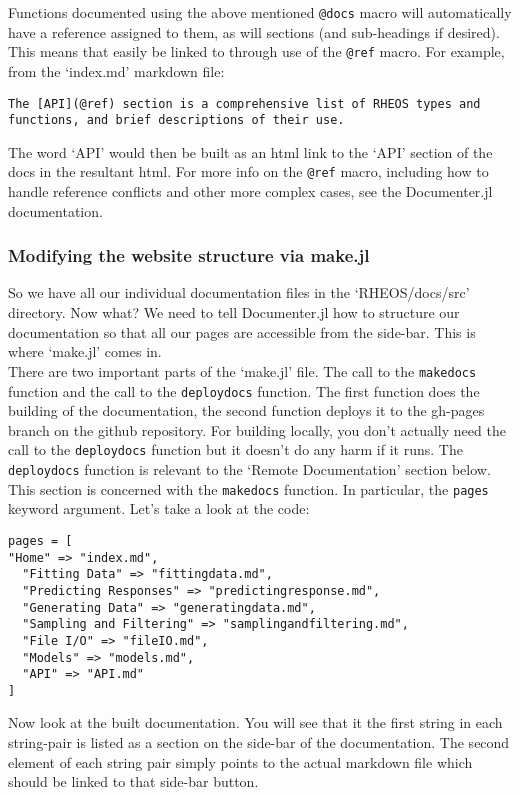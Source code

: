 \documentclass[]{article}
\newcommand{\cod}[1]{\colorbox{light-gray}{\texttt{#1}}}
\begin{document}
Functions documented using the above mentioned \cod{@docs} macro will automatically have a reference assigned to them, as will sections (and sub-headings if desired). This means that easily be linked to through use of the \cod{@ref} macro. For example, from the `index.md' markdown file:
\begin{verbatim}
The [API](@ref) section is a comprehensive list of RHEOS types and 
functions, and brief descriptions of their use.
\end{verbatim}
The word `API' would then be built as an html link to the `API' section of the docs in the resultant html. For more info on the \cod{@ref} macro, including how to handle reference conflicts and other more complex cases, see the Documenter.jl documentation.

\subsubsection{Modifying the website structure via make.jl}
So we have all our individual documentation files in the `RHEOS/docs/src' directory. Now what? We need to tell Documenter.jl how to structure our documentation so that all our pages are accessible from the side-bar. This is where `make.jl' comes in.\\

There are two important parts of the `make.jl' file. The call to the \cod{makedocs} function and the call to the \cod{deploydocs} function. The first function does the building of the documentation, the second function deploys it to the gh-pages branch on the github repository. For building locally, you don't actually need the call to the \cod{deploydocs} function but it doesn't do any harm if it runs. The \cod{deploydocs} function is relevant to the `Remote Documentation' section below. This section is concerned with the \cod{makedocs} function. In particular, the \cod{pages} keyword argument. Let's take a look at the code:
\begin{verbatim}
pages = [
"Home" => "index.md",
  "Fitting Data" => "fittingdata.md",
  "Predicting Responses" => "predictingresponse.md",
  "Generating Data" => "generatingdata.md",
  "Sampling and Filtering" => "samplingandfiltering.md",
  "File I/O" => "fileIO.md",
  "Models" => "models.md",
  "API" => "API.md"
]
\end{verbatim}
Now look at the built documentation. You will see that it the first string in each string-pair is listed as a section on the side-bar of the documentation. The second element of each string pair simply points to the actual markdown file which should be linked to that side-bar button.
\newpage
\end{document}
